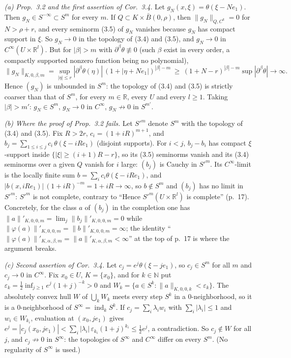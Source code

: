 \documentclass[11pt]{article}
\newcommand{\R}{\mathbb{R}}
\newcommand{\N}{\mathbb{N}}
\DeclareMathOperator{\ind}{ind}
\begin{document}
\emph{(a) Prop.~3.2 and the first assertion of Cor.~3.4.} Let $g_N(x,\xi)=\theta(\xi-Ne_1)$. Then $g_N\in S^{-\infty}\subset S^m$ for every $m$. If $Q\subset K\times\bar B(0,\rho)$, then $\|g_N\|_{Q,C^k}=0$ for $N>\rho+r$, and every seminorm (3.5) of $g_N$ vanishes because $g_N$ has compact support in $\xi$. So $g_N\to0$ in the topology of (3.4) and (3.5), and $g_N\to0$ in $C^\infty(U\times\R^l)$. But for $|\beta|>m$ with $\partial^\beta\theta\not\equiv0$ (such $\beta$ exist in every order, a compactly supported nonzero function being no polynomial),
\[
\|g_N\|_{K,0,\beta,m}=\sup_{|\eta|\le r}|\partial^\beta\theta(\eta)|\,(1+|\eta+Ne_1|)^{|\beta|-m}\ \ge\ (1+N-r)^{|\beta|-m}\sup|\partial^\beta\theta|\longrightarrow\infty .
\]
Hence $(g_N)$ is unbounded in $S^m$: the topology of (3.4) and (3.5) is strictly coarser than that of $S^m$, for every $m\in\R$, every $U$ and every $l\ge1$. Taking $|\beta|>m'$: $g_N\in S^m$, $g_N\to0$ in $C^\infty$, $g_N\not\to0$ in $S^{m'}$.

\emph{(b) Where the proof of Prop.~3.2 fails.} Let $S'^m$ denote $S^m$ with the topology of (3.4) and (3.5). Fix $R>2r$, $c_i=(1+iR)^{m+1}$, and $b_j=\sum_{1\le i\le j}c_i\,\theta(\xi-iRe_1)$ (disjoint supports). For $i<j$, $b_j-b_i$ has compact $\xi$-support inside $\{|\xi|\ge(i+1)R-r\}$, so its (3.5) seminorms vanish and its (3.4) seminorms over a given $Q$ vanish for $i$ large: $(b_j)$ is Cauchy in $S'^m$. Its $C^\infty$-limit is the locally finite sum $b=\sum_ic_i\theta(\xi-iRe_1)$, and $|b(x,iRe_1)|\,(1+iR)^{-m}=1+iR\to\infty$, so $b\notin S^m$ and $(b_j)$ has no limit in $S'^m$: $S'^m$ is not complete, contrary to ``Hence $S'^m(U\times\R^l)$ is complete'' (p.~17). Concretely, for the class $a$ of $(b_j)$ in the completion one has $\|a\|'_{K,0,0,m}=\lim_j\|b_j\|'_{K,0,0,m}=0$ while $\|\varphi(a)\|'_{K,0,0,m}=\|b\|'_{K,0,0,m}=\infty$; the identity ``$\|\varphi(a)\|'_{K,\alpha,\beta,m}=\|a\|'_{K,\alpha,\beta,m}<\infty$'' at the top of p.~17 is where the argument breaks.

\emph{(c) Second assertion of Cor.~3.4.} Let $c_j=e^j\theta(\xi-je_1)$, so $c_j\in S^m$ for all $m$ and $c_j\to0$ in $C^\infty$. Fix $x_0\in U$, $K=\{x_0\}$, and for $k\in\N$ put $\varepsilon_k=\tfrac12\inf_{j\ge1}e^j(1+j)^{-k}>0$ and $W_k=\{a\in S^k:\|a\|_{K,0,0,k}<\varepsilon_k\}$. The absolutely convex hull $W$ of $\bigcup_kW_k$ meets every step $S^k$ in a $0$-neighborhood, so it is a $0$-neighborhood of $S^\infty=\ind_kS^k$. If $c_j=\sum_i\lambda_iw_i$ with $\sum_i|\lambda_i|\le1$ and $w_i\in W_{k_i}$, evaluation at $(x_0,je_1)$ gives $e^j=|c_j(x_0,je_1)|<\sum_i|\lambda_i|\,\varepsilon_{k_i}(1+j)^{k_i}\le\tfrac12e^j$, a contradiction. So $c_j\notin W$ for all $j$, and $c_j\not\to0$ in $S^\infty$: the topologies of $S^\infty$ and $C^\infty$ differ on every $S^m$. (No regularity of $S^\infty$ is used.)
\end{document}
